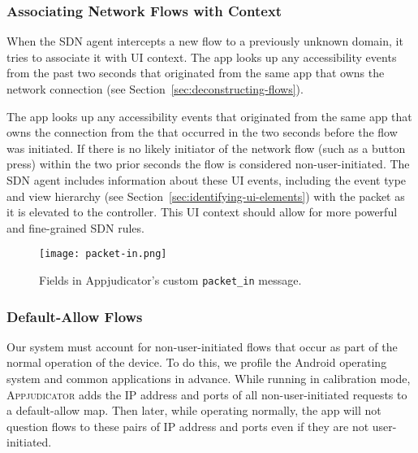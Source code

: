 \subsubsection{Associating Network Flows with Context}
\label{sec:associating-network-flows-with-context}

When the SDN agent intercepts a new flow to a previously unknown domain, it
tries to associate it with UI context. The app looks up any accessibility events
from the past two seconds that originated from the same app that owns the
network connection (see Section~\ref{sec:deconstructing-flows}).

The app looks up any accessibility events
that originated from the same app that owns the connection from the that occurred in the two seconds before the flow was initiated. If there is no
likely initiator of the network flow (such as a button press) within the two
prior seconds the flow is considered non-user-initiated. The SDN agent includes
information about these UI events, including the event type and view hierarchy
(see Section~\ref{sec:identifying-ui-elements}) with the packet as it is
elevated to the controller. This UI context should allow for more powerful and
fine-grained SDN rules.

\begin{figure}[p]
	\centering
	\texttt{[image: packet-in.png]}
    \caption{Fields in Appjudicator's custom \texttt{packet\_in} message.}
    \label{fig:packet-in}
\end{figure}

\subsubsection{Default-Allow Flows}
\label{sec:default-allow-flows}

Our system must account for non-user-initiated flows that occur as part of the
normal operation of the device. To do this, we profile the Android operating
system and common applications in advance.  While running in calibration mode,
\textsc{Appjudicator} adds the IP address and ports of all non-user-initiated
requests to a default-allow map. Then later, while operating normally, the app
will not question flows to these pairs of IP address and ports even if they are
not user-initiated.


\newpage
